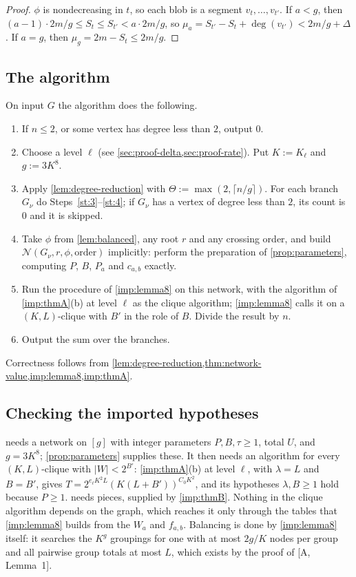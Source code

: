 \documentclass[11pt]{amsart}
\theoremstyle{plain}
\theoremstyle{definition}
\theoremstyle{remark}
\numberwithin{equation}{section}
\newcommand{\A}[1][]{\textup{[A\if\relax\detokenize{#1}\relax\else, #1\fi]}}
\begin{document}
\begin{proof}
$\phi$ is nondecreasing in $t$, so each blob is a segment $v_t,\dots,v_{t'}$. If $a<g$, then
$(a-1)\cdot 2m/g\le S_t\le S_{t'}<a\cdot2m/g$, so $\mu_a=S_{t'}-S_t+\deg(v_{t'})<2m/g+\Delta$. If
$a=g$, then $\mu_g=2m-S_t\le 2m/g$.
\end{proof}

\subsection{The algorithm}
On input $G$ the algorithm does the following.
\begin{enumerate}[label=\textbf{Step \arabic*.},ref=\arabic*,leftmargin=*,start=0]
\item\label{st:0} If $n\le2$, or some vertex has degree less than $2$, output $0$.
\item\label{st:1} Choose a level $\ell$ (see \cref{sec:proof-delta,sec:proof-rate}). Put $K:=K_\ell$
and $g:=3K^8$.
\item\label{st:2} Apply \cref{lem:degree-reduction} with $\Theta:=\max(2,\lceil n/g\rceil)$. For each
branch $G_\nu$ do Steps~\ref{st:3}--\ref{st:4}; if $G_\nu$ has a vertex of degree less than $2$,
its count is $0$ and it is skipped.
\item\label{st:3} Take $\phi$ from \cref{lem:balanced}, any root $r$ and any crossing order, and
build $\mathcal N(G_\nu,r,\phi,\text{order})$ implicitly: perform the preparation of
\cref{prop:parameters}, computing $P$, $B$, $P_a$ and $c_{a,b}$ exactly.
\item\label{st:4} Run the procedure of \cref{imp:lemma8} on this network, with the algorithm of
\cref{imp:thmA}(b) at level $\ell$ as the clique algorithm; \cref{imp:lemma8} calls it on a
$(K,L)$-clique with $B'$ in the role of $B$. Divide the result by $n$.
\item\label{st:5} Output the sum over the branches.
\end{enumerate}
Correctness follows from \cref{lem:degree-reduction,thm:network-value,imp:lemma8,imp:thmA}.

\subsection{Checking the imported hypotheses}
 needs a network on $[g]$ with integer parameters $P,B,\tau\ge1$, total $U$, and
$g=3K^8$; \cref{prop:parameters} supplies these. It then needs an algorithm for every
$(K,L)$-clique with $|W|<2^{B'}$: \cref{imp:thmA}(b) at level $\ell$, with $\lambda=L$ and $B=B'$,
gives $T=2^{e_\ell K^2L}(K(L+B'))^{C_0K^2}$, and its hypotheses $\lambda,B\ge1$ hold because
$P\ge1$.  needs pieces, supplied by \cref{imp:thmB}. Nothing in the clique
algorithm depends on the graph, which reaches it only through the tables that
\cref{imp:lemma8} builds from the $W_a$ and $f_{a,b}$. Balancing is done by \cref{imp:lemma8}
itself: it searches the $K^g$ groupings for one with at most $2g/K$ nodes per group and all
pairwise group totals at most $L$, which exists by the proof of \A[Lemma~1].
\end{document}

